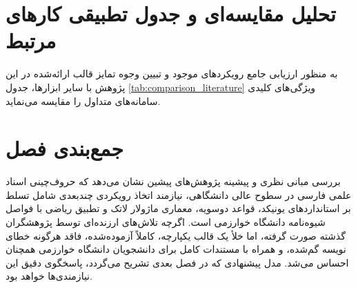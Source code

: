 \section{تحلیل مقایسه‌ای و جدول تطبیقی کارهای مرتبط}
\label{sec:ch2_comparison}

به منظور ارزیابی جامع رویکردهای موجود و تبیین وجوه تمایز قالب ارائه‌شده در این پژوهش با سایر ابزارها، جدول \ref{tab:comparison_literature} ویژگی‌های کلیدی سامانه‌های متداول را مقایسه می‌نماید.

\begin{table}[htbp]
\centering
\caption{مقایسه تطبیقی سامانه‌های حروف‌چینی و قالب‌های اسناد دانشگاهی}
\label{tab:comparison_literature}
\vspace{4pt}
\small
\setlength{\tabcolsep}{4pt}
\end{table}

\section{جمع‌بندی فصل}
\label{sec:ch2_summary}

بررسی مبانی نظری و پیشینه پژوهش‌های پیشین نشان می‌دهد که حروف‌چینی اسناد علمی فارسی در سطوح عالی دانشگاهی، نیازمند اتخاذ رویکردی چندبعدی شامل تسلط بر استانداردهای یونیکد، قواعد دوسویه، معماری ماژولار لاتک و تطبیق ریاضی با فواصل شیوه‌نامه دانشگاه خوارزمی است. اگرچه تلاش‌های ارزنده‌ای توسط پژوهشگران گذشته صورت گرفته، اما خلأ یک قالب یکپارچه، کاملاً آزموده‌شده، فاقد هرگونه خطای نویسه گم‌شده، و همراه با مستندات کامل برای دانشجویان دانشگاه خوارزمی همچنان احساس می‌شد. مدل پیشنهادی که در فصل بعدی تشریح می‌گردد، پاسخگوی دقیق این نیازمندی‌ها خواهد بود.
